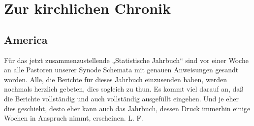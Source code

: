\chapter[Zur kirchlichen Chronik]{Zur kirchlichen Chronik}

\section{America}

Für das jetzt zusammenzustellende „Statistische Jahrbuch“ sind vor einer Woche an alle Pastoren unserer Synode Schemata mit genauen Anweisungen gesandt worden. Alle, die Berichte für dieses Jahrbuch einzusenden haben, werden nochmals herzlich gebeten, dies sogleich zu thun. Es kommt viel darauf an, daß die Berichte vollständig und auch vollständig ausgefüllt eingehen. Und je eher dies geschieht, desto eher kann auch das Jahrbuch, dessen Druck immerhin einige Wochen in Anspruch nimmt, erscheinen. L. F.
